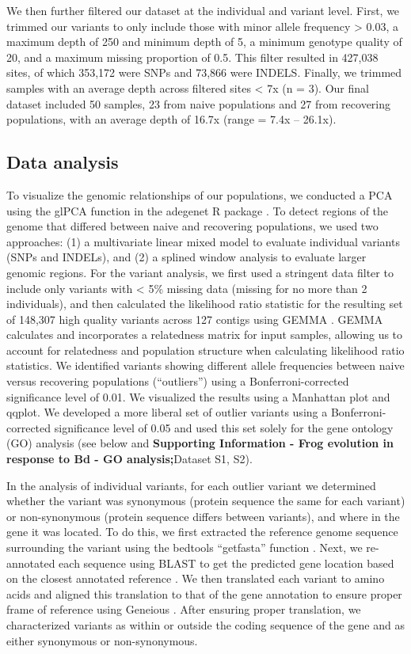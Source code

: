 \documentclass[9pt,twocolumn,twoside,lineno]{pnas-new}
\begin{document}
{We then further filtered our dataset at the individual and variant
level. First, we trimmed our variants to only include those with minor
allele frequency \textgreater{} 0.03, a maximum depth of 250 and minimum
depth of 5, a minimum genotype quality of 20, and a maximum missing
proportion of 0.5. This filter resulted in 427,038 sites, of which
353,172 were SNPs and 73,866 were INDELS. Finally, we trimmed samples
with an average depth across filtered sites \textless{} 7x (n = 3). Our
final dataset included 50 samples, 23 from naive populations and 27 from
recovering populations, with an average depth of 16.7x (range = 7.4x --
26.1x).

\hypertarget{data-analysis}{%
\subsection*{Data analysis}\label{data-analysis}}

To visualize the genomic relationships of our populations, we conducted
a PCA using the glPCA function in the adegenet R package
\citep{jombart2008}. To detect regions of the genome that differed
between naive and recovering populations, we used two approaches: (1) a
multivariate linear mixed model to evaluate individual variants (SNPs
and INDELs), and (2) a splined window analysis to evaluate larger
genomic regions. For the variant analysis, we first used a stringent
data filter to include only variants with \textless{} 5\% missing data
(missing for no more than 2 individuals), and then calculated the
likelihood ratio statistic for the resulting set of 148,307 high quality
variants across 127 contigs using GEMMA \citep{zhou2014}. GEMMA
calculates and incorporates a relatedness matrix for input samples,
allowing us to account for relatedness and population structure when
calculating likelihood ratio statistics. We identified variants showing
different allele frequencies between naive versus recovering populations
(``outliers'') using a Bonferroni-corrected significance level of 0.01.
We visualized the results using a Manhattan plot and qqplot. We
developed a more liberal set of outlier variants using a
Bonferroni-corrected significance level of 0.05 and used this set solely
for the gene ontology (GO) analysis (see below and \textbf{Supporting
Information - Frog evolution in response to Bd - GO analysis;}Dataset
S1, S2).

In the analysis of individual variants, for each outlier variant we
determined whether the variant was synonymous (protein sequence the same
for each variant) or non-synonymous (protein sequence differs between
variants), and where in the gene it was located. To do this, we first
extracted the reference genome sequence surrounding the variant using
the bedtools ``getfasta'' function \citep{quinlan2010}. Next, we
re-annotated each sequence using BLAST to get the predicted gene
location based on the closest annotated reference \citep{altschul1997}.
We then translated each variant to amino acids and aligned this
translation to that of the gene annotation to ensure proper frame of
reference using Geneious \citep{kearse2012}. After ensuring proper
translation, we characterized variants as within or outside the coding
sequence of the gene and as either synonymous or non-synonymous.

}
\end{document}
